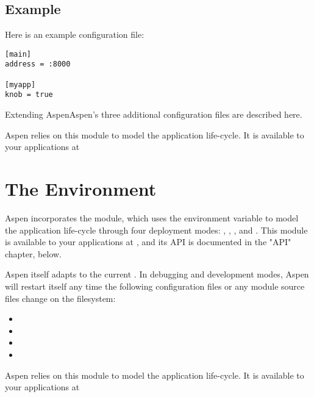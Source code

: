 \subsection{Example}

Here is an example  configuration file:

\begin{verbatim}
[main]
address = :8000

[myapp]
knob = true
\end{verbatim}


\begin{seealso}

{Extending Aspen}{Aspen's three additional configuration files are described
here.}

{}{Aspen relies on this module to model the application life-cycle.
It is available to your applications at }

\end{seealso}


\section{The Environment \label{environment}}

Aspen incorporates the  module, which uses the 
environment variable to model the application life-cycle through four deployment
modes: , , , and
. This module is available to your applications at
, and its API is documented in the "API" chapter, below.

Aspen itself adapts to the current . In debugging and
development modes, Aspen will restart itself any time the following
configuration files or any module source files change on the filesystem:

\begin{itemize}
\item{}
\item{}
\item{}
\item{}
\end{itemize}


\begin{seealso}

{}{Aspen relies on this module to model the application life-cycle.
It is available to your applications at }

\end{seealso}
